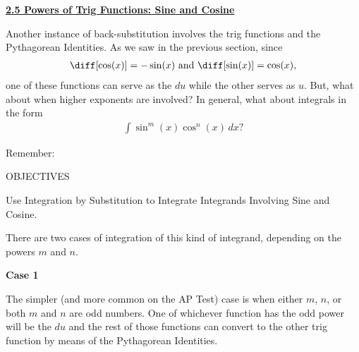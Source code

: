 \textbf{\underline{\large{2.5 Powers of Trig Functions: Sine and Cosine}}} \par

Another instance of back-substitution involves the trig functions and the Pythagorean Identities. As we saw in the previous section, since \begin{align*}
    \diff [\cos (x)] = -\sin (x) \text{ and } \diff [\sin (x)] = \cos (x),
\end{align*}
one of these functions can serve as the $du$ while the other serves as $u$. But, what about when higher exponents are involved? In general, what about integrals in the form \begin{align*}
    \int \sin^m (x)\cos^n (x) \, dx?
\end{align*}

Remember: \par


\begin{tcolorbox}[objective]
    \begin{center}
        OBJECTIVES \\[11pt]
    \end{center}
    Use Integration by Substitution to Integrate Integrands Involving Sine and Cosine.
\end{tcolorbox}

There are two cases of integration of this kind of integrand, depending on the powers $m$ and $n$. \par

\textbf{Case 1} \par

The simpler (and more common on the AP Test) case is when either $m$, $n$, or both $m$ and $n$ are odd numbers. One of whichever function has the odd power will be the $du$ and the rest of those functions can convert to the other trig function by means of the Pythagorean Identities. \par

